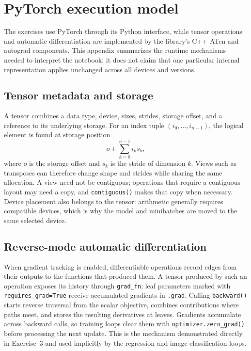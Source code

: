 \documentclass[../../labs.tex]{subfiles}
\begin{document}
\frontmatter
\def\labSolutionTitle{Laboratory 01: Deep Learning Foundations with PyTorch}
\def\labSolutionSubtitle{Complete notebook-aligned solution}

\tableofcontents
\mainmatter


\appendix
\chapter{PyTorch execution model}
\label{app:lab01_pytorch}

The exercises use PyTorch through its Python interface, while tensor operations and automatic differentiation are implemented by the library's C++ ATen and autograd components. This appendix summarizes the runtime mechanisms needed to interpret the notebook; it does not claim that one particular internal representation applies unchanged across all devices and versions.

\section{Tensor metadata and storage}

A tensor combines a data type, device, sizes, strides, storage offset, and a reference to its underlying storage. For an index tuple $(i_0,\ldots,i_{n-1})$, the logical element is found at storage position
\[
  o + \sum_{k=0}^{n-1} i_k s_k,
\]
where $o$ is the storage offset and $s_k$ is the stride of dimension $k$. Views such as transposes can therefore change shape and strides while sharing the same allocation. A view need not be contiguous; operations that require a contiguous layout may need a copy, and \texttt{contiguous()} makes that copy when necessary. Device placement also belongs to the tensor: arithmetic generally requires compatible devices, which is why the model and minibatches are moved to the same selected device.

\section{Reverse-mode automatic differentiation}

When gradient tracking is enabled, differentiable operations record edges from their outputs to the functions that produced them. A tensor produced by such an operation exposes its history through \texttt{grad\_fn}; leaf parameters marked with \texttt{requires\_grad=True} receive accumulated gradients in \texttt{.grad}. Calling \texttt{backward()} starts reverse traversal from the scalar objective, combines contributions where paths meet, and stores the resulting derivatives at leaves. Gradients accumulate across backward calls, so training loops clear them with \texttt{optimizer.zero\_grad()} before processing the next update. This is the mechanism demonstrated directly in Exercise~3 and used implicitly by the regression and image-classification loops.
\end{document}
